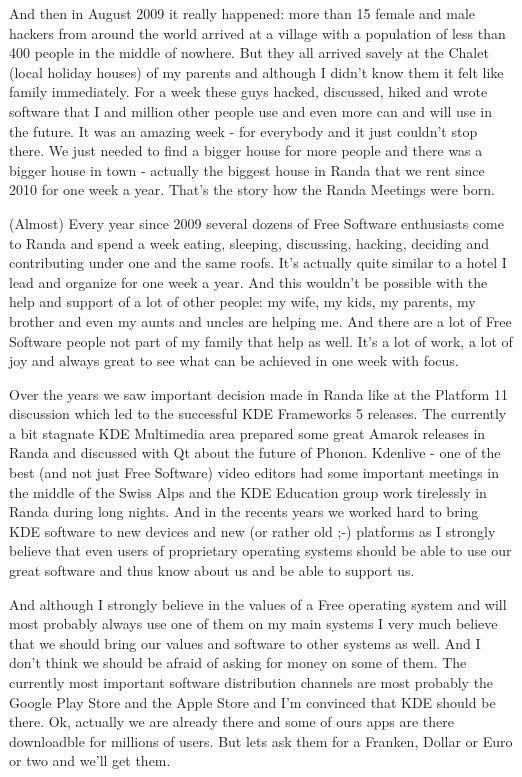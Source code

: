 And then in August 2009 it really happened: more than 15 female and male hackers from around the world arrived at a village with a population of less than 400 people in the middle of nowhere. But they all arrived savely at the Chalet (local holiday houses) of my parents and although I didn't know them it felt like family immediately. For a week these guys hacked, discussed, hiked and wrote software that I and million other people use and even more can and will use in the future. It was an amazing week - for everybody and it just couldn't stop there. We just needed to find a bigger house for more people and there was a bigger house in town - actually the biggest house in Randa that we rent since 2010 for one week a year. That's the story how the Randa Meetings were born.

(Almost) Every year since 2009 several dozens of Free Software enthusiasts come to Randa and spend a week eating, sleeping, discussing, hacking, deciding and contributing under one and the same roofs. It's actually quite similar to a hotel I lead and organize for one week a year. And this wouldn't be possible with the help and support of a lot of other people: my wife, my kids, my parents, my brother and even my aunts and uncles are helping me. And there are a lot of Free Software people not part of my family that help as well. It's a lot of work, a lot of joy and always great to see what can be achieved in one week with focus.

Over the years we saw important decision made in Randa like at the Platform 11 discussion which led to the successful KDE Frameworks 5 releases. The currently a bit stagnate KDE Multimedia area prepared some great Amarok releases in Randa and discussed with Qt about the future of Phonon. Kdenlive - one of the best (and not just Free Software) video editors had some important meetings in the middle of the Swiss Alps and the KDE Education group work tirelessly in Randa during long nights. And in the recents years we worked hard to bring KDE software to new devices and new (or rather old ;-) platforms as I strongly believe that even users of proprietary operating systems should be able to use our great software and thus know about us and be able to support us.

And although I strongly believe in the values of a Free operating system and will most probably always use one of them on my main systems I very much believe that we should bring our values and software to other systems as well. And I don't think we should be afraid of asking for money on some of them. The currently most important software distribution channels are most probably the Google Play Store and the Apple Store and I'm convinced that KDE should be there. Ok, actually we are already there and some of ours apps are there downloadble for millions of users. But lets ask them for a Franken, Dollar or Euro or two and we'll get them.

